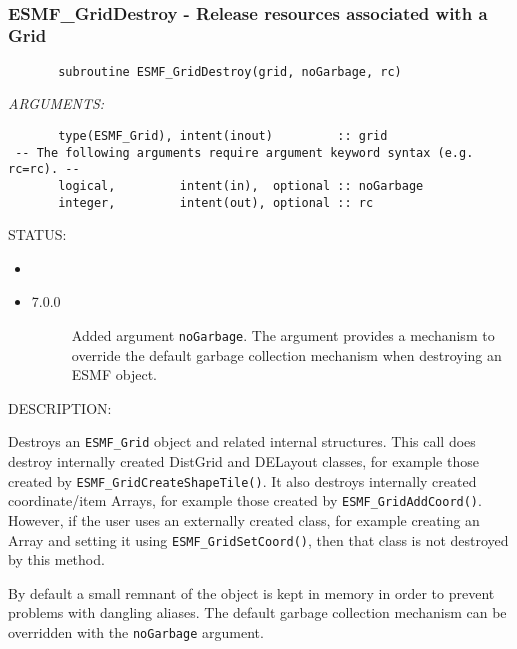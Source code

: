  
\mbox{}\hrulefill\ 
 
\subsubsection [ESMF\_GridDestroy] {ESMF\_GridDestroy - Release resources associated with a Grid}


 
\begin{verbatim}       subroutine ESMF_GridDestroy(grid, noGarbage, rc)\end{verbatim}{\em ARGUMENTS:}
\begin{verbatim}       type(ESMF_Grid), intent(inout)         :: grid
 -- The following arguments require argument keyword syntax (e.g. rc=rc). --
       logical,         intent(in),  optional :: noGarbage
       integer,         intent(out), optional :: rc\end{verbatim}
{\sf STATUS:}
   \begin{itemize}
   \item{}
   \item{}
   \begin{description}
   \item[7.0.0] Added argument {\tt noGarbage}.
     The argument provides a mechanism to override the default garbage collection
     mechanism when destroying an ESMF object.
   \end{description}
   \end{itemize}
  
{\sf DESCRIPTION:\\ }


   Destroys an {\tt ESMF\_Grid} object and related internal structures.
   This call does destroy internally created DistGrid and DELayout classes,
   for example those created by {\tt ESMF\_GridCreateShapeTile()}. It also
   destroys internally created coordinate/item Arrays, for example those
   created by {\tt ESMF\_GridAddCoord()}. However, if the user uses an
   externally created class, for example creating an Array and setting it
   using {\tt ESMF\_GridSetCoord()}, then that class is not destroyed by
   this method.
  
     By default a small remnant of the object is kept in memory in order to
     prevent problems with dangling aliases. The default garbage collection
     mechanism can be overridden with the {\tt noGarbage} argument.
  

